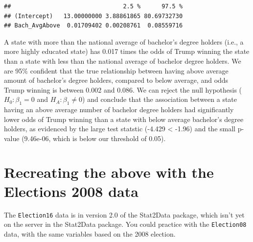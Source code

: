 \documentclass[]{article}
\newenvironment{Shaded}{\begin{snugshade}}{\end{snugshade}}
\newcommand{\DataTypeTok}[1]{\textcolor[rgb]{0.13,0.29,0.53}{#1}}
\newcommand{\DecValTok}[1]{\textcolor[rgb]{0.00,0.00,0.81}{#1}}
\newcommand{\FloatTok}[1]{\textcolor[rgb]{0.00,0.00,0.81}{#1}}
\newcommand{\KeywordTok}[1]{\textcolor[rgb]{0.13,0.29,0.53}{\textbf{#1}}}
\newcommand{\NormalTok}[1]{#1}
\newcommand{\OperatorTok}[1]{\textcolor[rgb]{0.81,0.36,0.00}{\textbf{#1}}}
\newcommand{\StringTok}[1]{\textcolor[rgb]{0.31,0.60,0.02}{#1}}
\begin{document}
\begin{verbatim}
##                                2.5 %      97.5 %
## (Intercept)   13.00000000 3.88861865 80.69732730
## Bach_AvgAbove  0.01709402 0.00208761  0.08559716
\end{verbatim}

A state with more than the national average of bachelor's degree holders
(i.e., a more highly educated state) has 0.017 times the odds of Trump
winning the state than a state with less than the national average of
bachelor degree holders. We are 95\% confident that the true
relationship between having above average amount of bachelor's degree
holders, compared to below average, and odds Trump winning is between
0.002 and 0.086. We can reject the null hypothesis (\(H_0: \beta_1 = 0\)
and \(H_A: \beta_1 \ne 0\)) and conclude that the association between a
state having an above average number of bachelor degree holders had
significantly lower odds of Trump winning than a state with below
average bachelor's degree holders, as evidenced by the large test
statstic (-4.429 \textless{} -1.96) and the small p-value (9.46e-06,
which is below our threshold of 0.05).

\hypertarget{recreating-the-above-with-the-elections-2008-data}{%
\section{Recreating the above with the Elections 2008
data}\label{recreating-the-above-with-the-elections-2008-data}}

The \texttt{Election16} data is in version 2.0 of the Stat2Data package,
which isn't yet on the server in the Stat2Data package. You could
practice with the \texttt{Election08} data, with the same variables
based on the 2008 election.

\begin{Shaded}
\end{Shaded}
\end{document}
